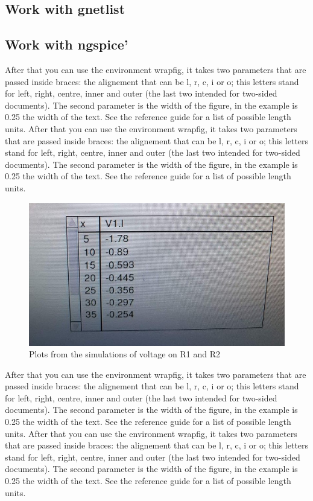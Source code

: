 \documentclass{report}
\begin{document}
\subsection{ Work with gnetlist}
 

 
\subsection{Work with ngspice’}
 After that you can use the environment wrapfig, it takes two parameters that are passed inside braces: the alignement that can be l, r, c, i or o; this letters stand for left, right, centre, inner and outer (the last two intended for two-sided documents). The second parameter is the width of the figure, in the example is 0.25 the width of the text. See the reference guide for a list of possible length units.
 After that you can use the environment wrapfig, it takes two parameters that are passed inside braces: the alignement that can be l, r, c, i or o; this letters stand for left, right, centre, inner and outer (the last two intended for two-sided documents). The second parameter is the width of the figure, in the example is 0.25 the width of the text. See the reference guide for a list of possible length units. \cite{firstRef,thirdRef}
 
 \begin{figure}[ht]
 \centering
\includegraphics[width=0.6\linewidth]{Figures/figure_4_.jpg} 
\caption{Plots from the simulations of voltage on R1 and R2}
\label{fig:figure5}
\end{figure}




 After that you can use the environment wrapfig, it takes two parameters that are passed inside braces: the alignement that can be l, r, c, i or o; this letters stand for left, right, centre, inner and outer (the last two intended for two-sided documents). The second parameter is the width of the figure, in the example is 0.25 the width of the text. See the reference guide for a list of possible length units.
 After that you can use the environment wrapfig, it takes two parameters that are passed inside braces: the alignement that can be l, r, c, i or o; this letters stand for left, right, centre, inner and outer (the last two intended for two-sided documents). The second parameter is the width of the figure, in the example is 0.25 the width of the text. See the reference guide for a list of possible length units.\cite{firstRef,thirdRef}
 
\end{document}
